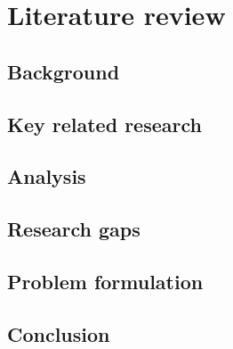 \chapter{Literature review}
\label{mathchapter}

\section{Background}
\section{Key related research}
\section{Analysis}
\section{Research gaps}
\section{Problem formulation}
\section{Conclusion}

